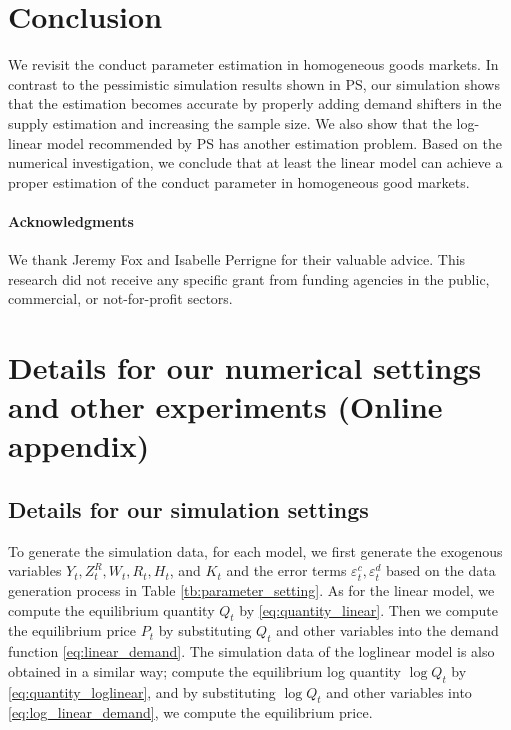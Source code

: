 \documentclass[11pt, a4paper]{article}
\begin{document}


\section{Conclusion}
We revisit the conduct parameter estimation in homogeneous goods markets. In contrast to the pessimistic simulation results shown in PS, our simulation shows that the estimation becomes accurate by properly adding demand shifters in the supply estimation and increasing the sample size. We also show that the log-linear model recommended by PS has another estimation problem. Based on the numerical investigation, we conclude that at least the linear model can achieve a proper estimation of the conduct parameter in homogeneous good markets.

\paragraph{Acknowledgments}
We thank Jeremy Fox and Isabelle Perrigne for their valuable advice. This research did not receive any specific grant from funding agencies in the public, commercial, or not-for-profit sectors. 




\newpage
\appendix

\section{Details for our numerical settings and other experiments (Online appendix)}\label{sec:appendix}

\subsection{Details for our simulation settings}

To generate the simulation data, for each model, we first generate the exogenous variables $Y_t, Z_t^R, W_t, R_t, H_t$, and $K_t$ and the error terms $\varepsilon_{t}^c, \varepsilon_{t}^d$ based on the data generation process in Table \ref{tb:parameter_setting}.
As for the linear model, we compute the equilibrium quantity $Q_t$ by \eqref{eq:quantity_linear}.
Then we compute the equilibrium price $P_t$ by substituting $Q_t$ and other variables into the demand function \eqref{eq:linear_demand}.
The simulation data of the loglinear model is also obtained in a similar way; compute the equilibrium log quantity $\log Q_t$ by \eqref{eq:quantity_loglinear}, and by substituting $\log Q_t$ and other variables into \eqref{eq:log_linear_demand}, we compute the equilibrium price.
\end{document}
